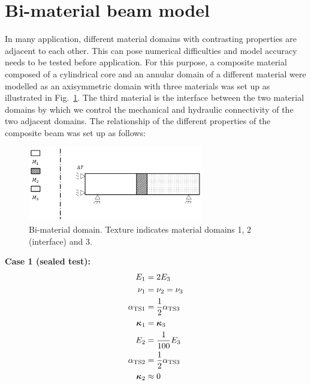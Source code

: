 \documentclass[a4paper,10pt]{article}
\begin{document}
\section*{Bi-material beam model}
In many application, different material domains with contrasting properties are adjacent to each other. This can pose numerical difficulties and model accuracy needs to be tested before application. For this purpose, a composite material composed of a cylindrical core and an annular domain of a different material were modelled as an axisymmetric domain with three materials was set up as illustrated in Fig.~\ref{fig:bp}. The third material is the interface between the two material domains by which we control the mechanical and hydraulic connectivity of the two adjacent domains. The relationship of the different properties of the composite beam was set up as follows: \\
\begin{figure}
	\centering
		\includegraphics*[width=3in, keepaspectratio=false]{figures/cbeam.pdf}
	\caption{Bi-material domain. Texture indicates material domains 1, 2 (interface) and 3.}
	\label{fig:bp}
\end{figure} 
\begin{minipage}{0.4\textwidth}
\textbf{Case 1 (sealed test):}
\begin{align*}
E_1 &= 2 E_3 \\
\nu_1 &= \nu_2 = \nu_3 \\
\alpha_\mathrm{TS1} &= \frac{1}{2} \alpha_\mathrm{TS3} \\
\boldsymbol{\kappa}_1 &= \boldsymbol{\kappa}_3 \\
E_2 &= \frac{1}{100} E_3 \\
\alpha_\mathrm{TS2} &= \frac{1}{2} \alpha_\mathrm{TS3} \\
\boldsymbol{\kappa}_2 &\approx 0
\end{align*}
\end{minipage}
\end{document}
